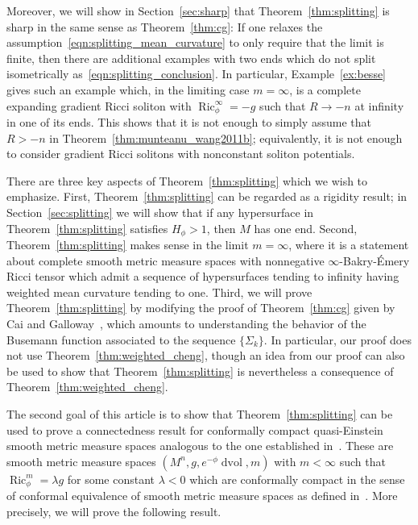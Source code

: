 \documentclass{amsart}
\theoremstyle{definition}
\theoremstyle{remark}
\numberwithin{equation}{section}
\begin{document}
Moreover, we will show in Section~\ref{sec:sharp} that Theorem~\ref{thm:splitting} is sharp in the same sense as Theorem~\ref{thm:cg}: If one relaxes the assumption~\eqref{eqn:splitting_mean_curvature} to only require that the limit is finite, then there are additional examples with two ends which do not split isometrically as~\eqref{eqn:splitting_conclusion}.  In particular, Example~\ref{ex:besse} gives such an example which, in the limiting case $m=\infty$, is a complete expanding gradient Ricci soliton with $\operatorname{Ric}_\phi^\infty=-g$ such that $R\to-n$ at infinity in one of its ends.  This shows that it is not enough to simply assume that $R>-n$ in Theorem~\ref{thm:munteanu_wang2011b}; equivalently, it is not enough to consider gradient Ricci solitons with nonconstant soliton potentials.

There are three key aspects of Theorem~\ref{thm:splitting} which we wish to emphasize.  First, Theorem~\ref{thm:splitting} can be regarded as a rigidity result; in Section~\ref{sec:splitting} we will show that if any hypersurface in Theorem~\ref{thm:splitting} satisfies $H_\phi>1$, then $M$ has one end.  Second, Theorem~\ref{thm:splitting} makes sense in the limit $m=\infty$, where it is a statement about complete smooth metric measure spaces with nonnegative $\infty$-Bakry-\'Emery Ricci tensor which admit a sequence of hypersurfaces tending to infinity having weighted mean curvature tending to one.  Third, we will prove Theorem~\ref{thm:splitting} by modifying the proof of Theorem~\ref{thm:cg} given by Cai and Galloway~\cite{CaiGalloway1999}, which amounts to understanding the behavior of the Busemann function associated to the sequence $\{\Sigma_k\}$.  In particular, our proof does not use Theorem~\ref{thm:weighted_cheng}, though an idea from our proof can also be used to show that Theorem~\ref{thm:splitting} is nevertheless a consequence of Theorem~\ref{thm:weighted_cheng}.

The second goal of this article is to show that Theorem~\ref{thm:splitting} can be used to prove a connectedness result for conformally compact quasi-Einstein smooth metric measure spaces analogous to the one established in~\cite{CaiGalloway1999,WittenYau1999}.  These are smooth metric measure spaces $(M^n,g,e^{-\phi}\operatorname{dvol},m)$ with $m<\infty$ such that $\operatorname{Ric}_\phi^m=\lambda g$ for some constant $\lambda<0$ which are conformally compact in the sense of conformal equivalence of smooth metric measure spaces as defined in~\cite{Case2010a}.  More precisely, we will prove the following result.
\end{document}
